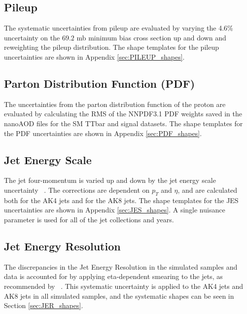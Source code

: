 \subsection{Pileup} \label{sectionPUunc}

The systematic uncertainties from pileup are evaluated by varying the 4.6\% uncertainty on the $69.2$ mb minimum bias cross section up and down and reweighting the pileup distribution. The shape templates for the pileup uncertainties are shown in Appendix \ref{sec:PILEUP_shapes}.

\subsection{Parton Distribution Function (PDF)} \label{sectionPDFunc}

The uncertainties from the parton distribution function of the proton are evaluated by calculating the RMS of the NNPDF3.1 PDF weights saved in the nanoAOD files for the SM TTbar and signal datasets. The shape templates for the PDF uncertainties are shown in Appendix \ref{sec:PDF_shapes}.

\subsection{Jet Energy Scale}

The jet four-momentum is varied up and down by the jet energy scale uncertainty ~\cite{CMS:JER}. The corrections are dependent on  $p_T$ and $\eta$, and are calculated both for the AK4 jets and for the AK8 jets. The shape templates for the JES uncertainties are shown in Appendix \ref{sec:JES_shapes}. A single nuisance parameter is used for all of the jet collections and years. 

\subsection{Jet Energy Resolution}

The discrepancies in the Jet Energy Resolution in the simulated samples and data is accounted for by applying eta-dependent smearing to the jets, as recommended by ~\cite{CMS:JER}. This systematic uncertainty is applied to the AK4 jets and AK8 jets in all simulated samples, and the systematic shapes can be seen in Section \ref{sec:JER_shapes}. 








